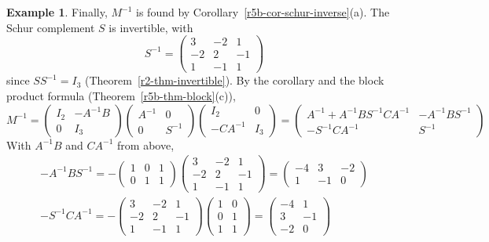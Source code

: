 \documentclass[12pt]{article}
\theoremstyle{definition}
\newtheorem{example}[theorem]{Example}
\begin{document}
\begin{example}
Finally, \(M^{-1}\) is found by Corollary~\ref{r5b-cor-schur-inverse}(a). The Schur complement \(S\) is invertible, with
\[
S^{-1}=\begin{pmatrix}3&-2&1\\-2&2&-1\\1&-1&1\end{pmatrix}
\]
since \(SS^{-1}=I_3\) (Theorem~\ref{r2-thm-invertible}). By the corollary and the block product formula
(Theorem~\ref{r5b-thm-block}(c)),
\[
M^{-1}=\begin{pmatrix}I_2&-A^{-1}B\\0&I_3\end{pmatrix}\begin{pmatrix}A^{-1}&0\\0&S^{-1}\end{pmatrix}
\begin{pmatrix}I_2&0\\-CA^{-1}&I_3\end{pmatrix}
=\begin{pmatrix}A^{-1}+A^{-1}BS^{-1}CA^{-1}&-A^{-1}BS^{-1}\\-S^{-1}CA^{-1}&S^{-1}\end{pmatrix}
\]
With \(A^{-1}B\) and \(CA^{-1}\) from above,
\[
\begin{gathered}
-A^{-1}BS^{-1}=-\begin{pmatrix}1&0&1\\0&1&1\end{pmatrix}\begin{pmatrix}3&-2&1\\-2&2&-1\\1&-1&1\end{pmatrix}
=\begin{pmatrix}-4&3&-2\\1&-1&0\end{pmatrix}\\
-S^{-1}CA^{-1}=-\begin{pmatrix}3&-2&1\\-2&2&-1\\1&-1&1\end{pmatrix}\begin{pmatrix}1&0\\0&1\\1&1\end{pmatrix}
=\begin{pmatrix}-4&1\\3&-1\\-2&0\end{pmatrix}
\end{gathered}
\]
\end{example}
\end{document}
